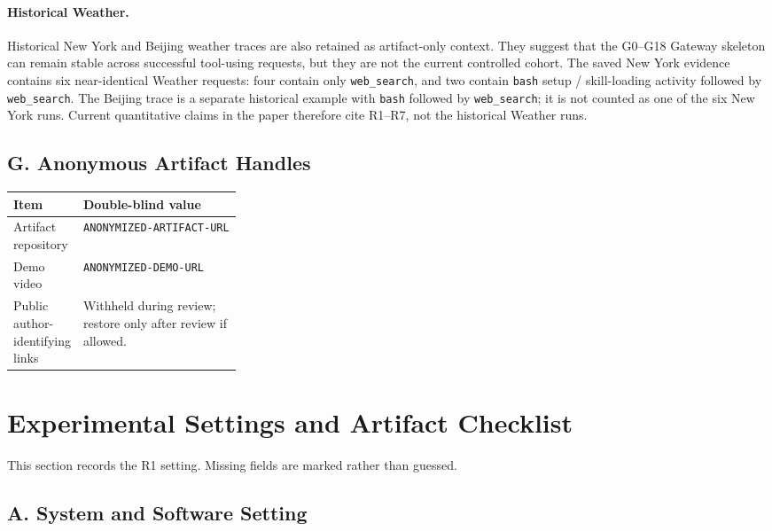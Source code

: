 \paragraph{Historical Weather.}
Historical New York and Beijing weather traces are also retained as
artifact-only context. They suggest that the G0--G18 Gateway skeleton can
remain stable across successful tool-using requests, but they are not the
current controlled cohort. The saved New York evidence contains six
near-identical Weather requests: four contain only \texttt{web\_search},
and two contain \texttt{bash} setup / skill-loading activity followed by
\texttt{web\_search}. The Beijing trace is a separate historical example
with \texttt{bash} followed by \texttt{web\_search}; it is not counted as
one of the six New York runs. Current quantitative claims in the paper
therefore cite R1--R7, not the historical Weather runs.

\subsection*{G. Anonymous Artifact Handles}

\begin{tabularx}{\linewidth}{
    @{}
    >{\raggedright\arraybackslash}p{0.30\linewidth}
    >{\raggedright\arraybackslash}X
    @{}
}
\toprule
\textbf{Item} &
\textbf{Double-blind value} \\
\midrule
Artifact repository &
\texttt{ANONYMIZED-ARTIFACT-URL} \\
\addlinespace
Demo video &
\texttt{ANONYMIZED-DEMO-URL} \\
\addlinespace
Public author-identifying links &
Withheld during review; restore only after review if allowed. \\
\bottomrule
\end{tabularx}

\clearpage
\section{Experimental Settings and Artifact Checklist}
\label{app:experiment-settings}

This section records the R1 setting. Missing fields are marked rather
than guessed.

\subsection*{A. System and Software Setting}

